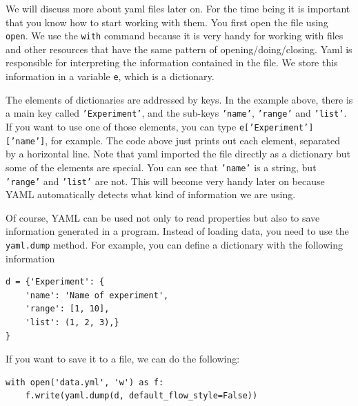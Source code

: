 We will discuss more about yaml files later on. For the time being it is important that you know how to start working with them. You first open the file using \texttt{open}. We use the \texttt{with} command because it is very handy for working with files and other resources that have the same pattern of opening/doing/closing. Yaml is responsible for interpreting the information contained in the file. We store this information in a variable \texttt{e}, which is a dictionary. 

The elements of dictionaries are addressed by keys. In the example above, there is a main key called \texttt{'Experiment'}, and the
sub-keys \texttt{'name'}, \texttt{'range'} and \texttt{'list'}. If you want to use
one of those elements, you can type \texttt{e['Experiment']['name']}, for example. The code above just prints out each element,
separated by a horizontal line. Note that yaml imported the file directly as a dictionary but some of the elements are special. You can see that \texttt{'name'} is a string, but \texttt{'range'} and \texttt{'list'} are not. This will become very handy later on because YAML automatically detects what kind of information we are using. 



Of course, YAML can be used not only to read properties but also to save information generated in a program. Instead of loading data, you need to use the \texttt{yaml.dump} method. For example, you can define a dictionary with the following information

\begin{verbatim}
d = {'Experiment': {
    'name': 'Name of experiment',
    'range': [1, 10],
    'list': (1, 2, 3),}
}
\end{verbatim}

If you want to save it to a file, we can do the following:

\begin{verbatim}
with open('data.yml', 'w') as f:
    f.write(yaml.dump(d, default_flow_style=False))
\end{verbatim}

